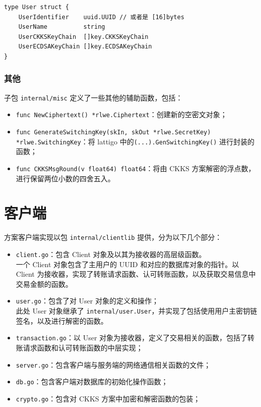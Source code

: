 \begin{verbatim}
type User struct {
    UserIdentifier    uuid.UUID // 或者是 [16]bytes
    UserName          string
    UserCKKSKeyChain  []key.CKKSKeyChain
    UserECDSAKeyChain []key.ECDSAKeyChain
}
\end{verbatim}

\subsubsection{其他}

子包 \verb|internal/misc| 定义了一些其他的辅助函数，包括：

\begin{itemize}
    \item \verb|func NewCiphertext() *rlwe.Ciphertext|：创建新的空密文对象；
    \item \verb|func GenerateSwitchingKey(skIn, skOut *rlwe.SecretKey)|\\
    \verb|*rlwe.SwitchingKey|：将 lattigo 中的\verb|(...).GenSwitchingKey()| 进行封装的函数；
    \item \verb|func CKKSMsgRound(v float64) float64|：将由 CKKS 方案解密的浮点数，进行保留两位小数的四舍五入。
\end{itemize}

\section{客户端}

方案客户端实现以包 \verb|internal/clientlib| 提供，分为以下几个部分：

\begin{itemize}
    \item \verb|client.go|：包含 Client 对象及以其为接收器的高层级函数。\\
    一个 Client 对象包含了主用户的 UUID 和对应的数据库对象的指针。以 Client 为接收器，实现了转账请求函数、认可转账函数，以及获取交易信息中交易金额的函数。
    \item \verb|user.go|：包含了对 User 对象的定义和操作；\\
    此处 User 对象继承了 \verb|internal/user.User|，并实现了包括使用用户主密钥链签名，以及进行解密的函数。
    \item \verb|transaction.go|：以 User 对象为接收器，定义了交易相关的函数，包括了转账请求函数和认可转账函数的中层实现；
    \item \verb|server.go|：包含客户端与服务端的网络通信相关函数的文件；
    \item \verb|db.go|：包含客户端对数据库的初始化操作函数；
    \item \verb|crypto.go|：包含对 CKKS 方案中加密和解密函数的包装；
\end{itemize}

